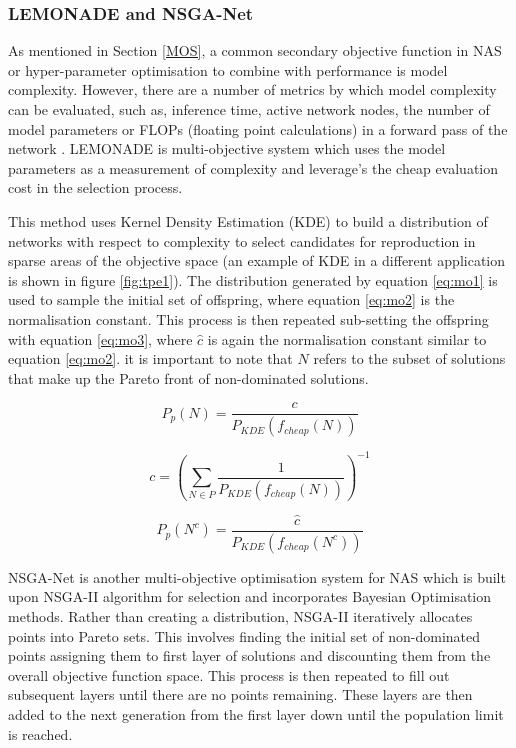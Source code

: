 \documentclass{article}
\begin{document}
\newpage

		\subsubsection{LEMONADE and NSGA-Net}		

			As mentioned in Section \ref{MOS}, a common secondary objective function in NAS or hyper-parameter optimisation to combine with performance is model complexity. However, there are a number of metrics by which model complexity can be evaluated, such as, inference time, active network nodes, the number of model parameters or FLOPs (floating point calculations) in a forward pass of the network \cite{5}. 
			LEMONADE \cite{13} is multi-objective system which uses the model parameters as a measurement of complexity and leverage's the cheap evaluation cost in the selection process.

			This method uses Kernel Density Estimation (KDE) to build a distribution of networks with respect to complexity to select candidates for reproduction in sparse areas of the objective space (an example of KDE in a different application is shown in figure \ref{fig:tpe1}). The distribution generated by equation \ref{eq:mo1} is used to sample the initial set of offspring, where equation \ref{eq:mo2} is the normalisation constant. This process is then repeated sub-setting the offspring with equation \ref{eq:mo3}, where \(\hat{c}\) is again the normalisation constant similar to equation \ref{eq:mo2}. it is important to note that \(N\) refers to the subset of solutions that make up the Pareto front of non-dominated solutions.

			\begin{equation}\label{eq:mo1}
				P_p(N) = \frac{c}{P_{KDE}(f_{cheap}(N))}
			\end{equation}

			\begin{equation}\label{eq:mo2}
				c = \left(\sum_{N\in P}\frac{1}{P_{KDE}(f_{cheap}(N))}\right)^{-1}
			\end{equation}

			\begin{equation}\label{eq:mo3}
				P_p(N^c) = \frac{\hat{c}}{P_{KDE}(f_{cheap}(N^c))}
			\end{equation}


			NSGA-Net \cite{5} is another multi-objective optimisation system for NAS which is built upon NSGA-II algorithm\cite{42} for selection and incorporates Bayesian Optimisation methods. Rather than creating a distribution, NSGA-II iteratively allocates points into Pareto sets. This involves finding the initial set of non-dominated points assigning them to first layer of solutions and discounting them from the overall objective function space. This process is then repeated to fill out subsequent layers until there are no points remaining. These layers are then added to the next generation from the first layer down until the population limit is reached. 
\end{document}
